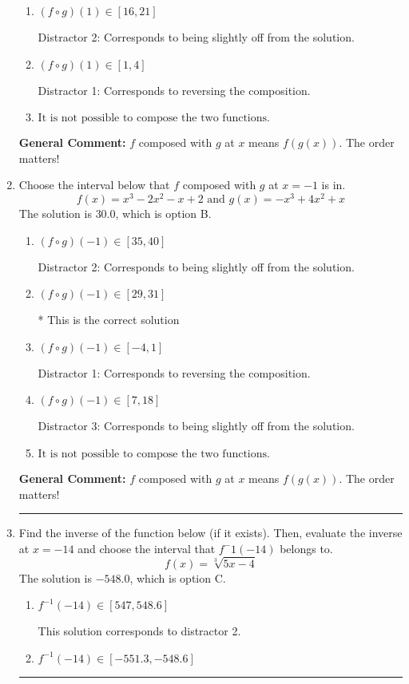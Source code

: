 \documentclass{extbook}[14pt]
\newcommand{\litem}[1]{\item #1

\rule{\textwidth}{0.4pt}}
\begin{document}
\begin{enumerate}
{\begin{enumerate}[label=\Alph*.]
* This is the correct solution
\item \( (f \circ g)(1) \in [16, 21] \)

 Distractor 2: Corresponds to being slightly off from the solution.
\item \( (f \circ g)(1) \in [1, 4] \)

 Distractor 1: Corresponds to reversing the composition.
\item \( \text{It is not possible to compose the two functions.} \)


\end{enumerate}

\textbf{General Comment:} $f$ composed with $g$ at $x$ means $f(g(x))$. The order matters!
}
\litem{
Choose the interval below that $f$ composed with $g$ at $x=-1$ is in.
\[ f(x) = x^{3} -2 x^{2} -x + 2 \text{ and } g(x) = -x^{3} +4 x^{2} +x \]The solution is \( 30.0 \), which is option B.\begin{enumerate}[label=\Alph*.]
\item \( (f \circ g)(-1) \in [35, 40] \)

 Distractor 2: Corresponds to being slightly off from the solution.
\item \( (f \circ g)(-1) \in [29, 31] \)

* This is the correct solution
\item \( (f \circ g)(-1) \in [-4, 1] \)

 Distractor 1: Corresponds to reversing the composition.
\item \( (f \circ g)(-1) \in [7, 18] \)

 Distractor 3: Corresponds to being slightly off from the solution.
\item \( \text{It is not possible to compose the two functions.} \)


\end{enumerate}

\textbf{General Comment:} $f$ composed with $g$ at $x$ means $f(g(x))$. The order matters!
}
\litem{
Find the inverse of the function below (if it exists). Then, evaluate the inverse at $x = -14$ and choose the interval that $f^-1(-14)$ belongs to.
\[ f(x) = \sqrt[3]{5 x - 4} \]The solution is \( -548.0 \), which is option C.\begin{enumerate}[label=\Alph*.]
\item \( f^{-1}(-14) \in [547, 548.6] \)

 This solution corresponds to distractor 2.
\item \( f^{-1}(-14) \in [-551.3, -548.6] \)


\end{enumerate}}
\end{enumerate}
\end{document}
